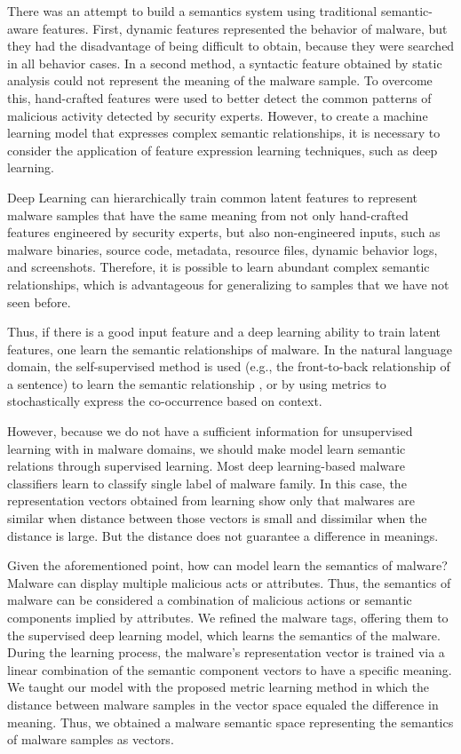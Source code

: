 There was an attempt to build a semantics system using traditional semantic-aware features. First, dynamic features represented the behavior of malware, but they had the disadvantage of being difficult to obtain, because they were searched in all behavior cases\cite{jiang2007stealthy, yan2012droidscope, reina2013system}. In a second method, a syntactic feature obtained by static analysis could not represent the meaning of the malware sample\cite{christodorescu2005semantics, zhang2014semantics}. To overcome this, hand-crafted features were used to better detect the common patterns of malicious activity detected by security experts\cite{jang2011bitshred}. However, to create a machine learning model that expresses complex semantic relationships, it is necessary to consider the application of feature expression learning techniques, such as deep learning.
 
Deep Learning can hierarchically train common latent features to represent malware samples that have the same meaning from not only hand-crafted features engineered by security experts, but also non-engineered inputs, such as malware binaries, source code, metadata, resource files, dynamic behavior logs, and screenshots. Therefore, it is possible to learn abundant complex semantic relationships, which is advantageous for generalizing to samples that we have not seen before.


Thus, if there is a good input feature and a deep learning ability to train latent features, one learn the semantic relationships of malware. In the natural language domain, the self-supervised method is used (e.g., the front-to-back relationship of a sentence) to learn the semantic relationship \cite{mikolov2013efficient}, or by using metrics to stochastically express the co-occurrence based on context\cite{pennington2014glove}.


However, because we do not have a sufficient information for unsupervised learning with  in malware domains, we should make model learn semantic relations through supervised learning. Most deep learning-based malware classifiers learn to classify single label of malware family. In this case, the representation vectors obtained from learning show only that malwares are similar when distance between those vectors is small and dissimilar when the distance is large. But the distance does not guarantee a difference in meanings.

Given the aforementioned point, how can model learn the semantics of malware? Malware can display multiple malicious acts or attributes. Thus, the semantics of malware can be considered a combination of malicious actions or semantic components implied by attributes. We refined the malware tags, offering them to the supervised deep learning model, which learns the semantics of the malware. During the learning process, the malware's representation vector is trained via a linear combination of the semantic component vectors to have a specific meaning. We taught our model with the proposed metric learning method in which the distance between malware samples in the vector space equaled the difference in meaning. Thus, we obtained a malware semantic space representing the semantics of malware samples as vectors.

